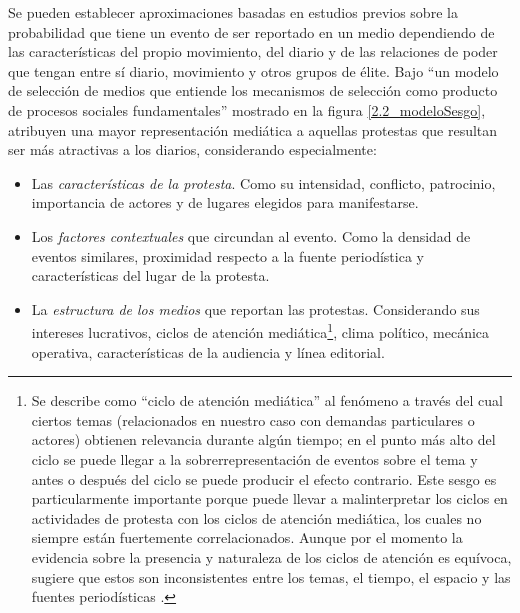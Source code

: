 \documentclass[letterpaper, 11pt]{book}
\theoremstyle{definition}
\theoremstyle{remark}
\begin{document}
Se pueden establecer aproximaciones basadas en estudios previos sobre la probabilidad que tiene un evento de ser reportado en un medio dependiendo de las características del propio movimiento, del diario y de las relaciones de poder que tengan entre sí diario, movimiento y otros grupos de élite. 
Bajo ``un modelo de selección de medios que entiende los mecanismos de selección como producto de procesos sociales fundamentales'' mostrado en la figura \ref{2.2_modeloSesgo}, \citet{2005_Ortiz_NewspaperData} atribuyen una mayor representación mediática a aquellas protestas que resultan ser más atractivas a los diarios, considerando especialmente:

\begin{itemize}
    \item Las \emph{características de la protesta}. Como su intensidad, conflicto, patrocinio, importancia de actores y de lugares elegidos para manifestarse.
    \item Los \emph{factores contextuales} que circundan al evento. Como la densidad de eventos similares, proximidad respecto a la fuente periodística y características del lugar de la protesta.
    \item La \emph{estructura de los medios} que reportan las protestas. 
    Considerando sus intereses lucrativos, ciclos de atención mediática\footnote{Se describe como ``ciclo de atención mediática'' al fenómeno a través del cual ciertos temas (relacionados en nuestro caso con demandas particulares o actores) obtienen relevancia durante algún tiempo; en el punto más alto del ciclo se puede llegar a la sobrerrepresentación de eventos sobre el tema y antes o después del ciclo se puede producir el efecto contrario. 
    Este sesgo es particularmente importante porque puede llevar a malinterpretar los ciclos en actividades de protesta con los ciclos de atención mediática, los cuales no siempre están fuertemente correlacionados. 
    Aunque por el momento la evidencia sobre la presencia y naturaleza de los ciclos de atención es equívoca, sugiere que estos son inconsistentes entre los temas, el tiempo, el espacio y las fuentes periodísticas \citep[401]{2005_Ortiz_NewspaperData}.}, clima político, mecánica operativa, características de la audiencia y línea editorial.
\end{itemize}
\end{document}
